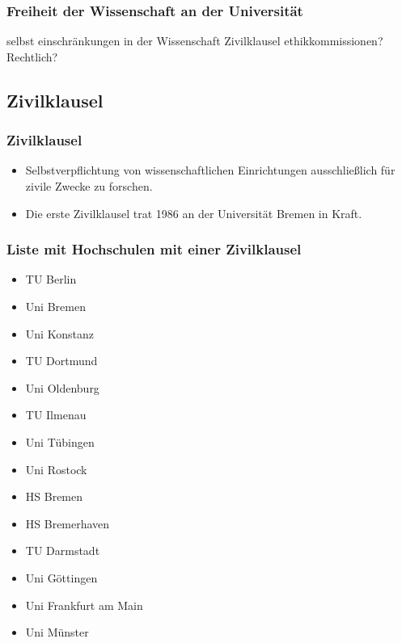 \begin{frame}
\frametitle{Freiheit der Wissenschaft an der Universität}
selbst einschränkungen in der Wissenschaft
    Zivilklausel
    ethikkommissionen? Rechtlich?
\end{frame}

\subsection*{Zivilklausel}
\begin{frame}
\frametitle{Zivilklausel}
\begin{itemize}
\item Selbstverpflichtung von wissenschaftlichen Einrichtungen ausschließlich für zivile Zwecke zu forschen. \cite{ZivKlausel}
\item Die erste Zivilklausel trat 1986 an der Universität Bremen in Kraft.
\end{itemize}

\end{frame}

\begin{frame}
\frametitle{Liste mit Hochschulen mit einer Zivilklausel}
\begin{multicols}{2}
\begin{itemize}
\item TU Berlin
\item Uni Bremen
\item Uni Konstanz
\item TU Dortmund
\item Uni Oldenburg
\item TU Ilmenau
\item Uni Tübingen
\item Uni Rostock
\item HS Bremen
\item HS Bremerhaven
\item TU Darmstadt
\item Uni Göttingen
\item Uni Frankfurt am Main
\item Uni Münster
\end{itemize}
\end{multicols}

\end{frame}

